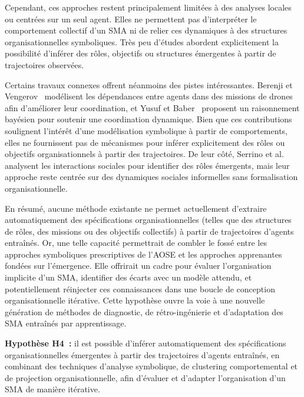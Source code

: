 Cependant, ces approches restent principalement limitées à des analyses locales ou centrées sur un seul agent. Elles ne permettent pas d'interpréter le comportement collectif d'un \ac{SMA} ni de relier ces dynamiques à des structures organisationnelles symboliques. Très peu d'études abordent explicitement la possibilité d'inférer des rôles, objectifs ou structures émergentes à partir de trajectoires observées.

Certains travaux connexes offrent néanmoins des pistes intéressantes. Berenji et Vengerov~\cite{berenji2000learning} modélisent les dépendances entre agents dans des missions de drones afin d'améliorer leur coordination, et Yusuf et Baber~\cite{yusuf2020inferential} proposent un raisonnement bayésien pour soutenir une coordination dynamique. Bien que ces contributions soulignent l'intérêt d'une modélisation symbolique à partir de comportements, elles ne fournissent pas de mécanismes pour inférer explicitement des rôles ou objectifs organisationnels à partir des trajectoires. De leur côté, Serrino et al.~\cite{serrino2019finding} analysent les interactions sociales pour identifier des rôles émergents, mais leur approche reste centrée sur des dynamiques sociales informelles sans formalisation organisationnelle.

En résumé, aucune méthode existante ne permet actuellement d'extraire automatiquement des spécifications organisationnelles (telles que des structures de rôles, des missions ou des objectifs collectifs) à partir de trajectoires d'agents entraînés. Or, une telle capacité permettrait de combler le fossé entre les approches symboliques prescriptives de l'\ac{AOSE} et les approches apprenantes fondées sur l'émergence. Elle offrirait un cadre pour évaluer l'organisation implicite d'un \ac{SMA}, identifier des écarts avec un modèle attendu, et potentiellement réinjecter ces connaissances dans une boucle de conception organisationnelle itérative. Cette hypothèse ouvre la voie à une nouvelle génération de méthodes de diagnostic, de rétro-ingénierie et d'adaptation des \ac{SMA} entraînés par apprentissage.

\medskip

\noindent
\textbf{Hypothèse H4~:} il est possible d'inférer automatiquement des spécifications organisationnelles émergentes à partir des trajectoires d'agents entraînés, en combinant des techniques d'analyse symbolique, de clustering comportemental et de projection organisationnelle, afin d'évaluer et d'adapter l'organisation d'un \ac{SMA} de manière itérative.


